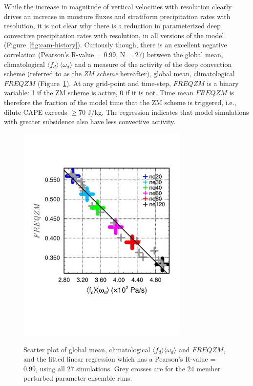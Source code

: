 \documentclass[alpha-refs]{wiley-article}
\begin{document}
While the increase in magnitude of vertical velocities with resolution clearly drives an increase in moisture fluxes and stratiform precipitation rates with resolution, it is not clear why there is a reduction in parameterized deep convective precipitation rates with resolution, in all versions of the model (Figure~\ref{fig:cam-history}). Curiously though, there is an excellent negative correlation (Pearson's R-value = 0.99, N = 27) between the global mean, climatological $\langle f_{d} \rangle \, \langle \omega_{d} \rangle$ and a measure of the activity of the \cite{ZM1995AO} deep convection scheme (referred to as the {\em{ZM scheme}} hereafter), global mean, climatological $FREQZM$ (Figure~\ref{fig:corr}). At any grid-point and time-step, $FREQZM$ is a binary variable: 1 if the ZM scheme is active, 0 if it is not. Time mean $FREQZM$ is therefore the fraction of the model time that the ZM scheme is triggered, i.e., dilute CAPE exceeds $\geq 70$ J/kg. The regression indicates that model simulations with greater subsidence also have less convective activity.

\begin{figure}
\begin{center}
\noindent\includegraphics[width=20pc,angle=0]{figs/temp_diags_corr.pdf}\\
\end{center}
\caption{Scatter plot of global mean, climatological $\langle f_{d} \rangle \langle \omega_{d} \rangle$ and $FREQZM$, and the fitted linear regression which has a Pearson's R-value = 0.99, using all 27 simulations. Grey crosses are for the 24 member perturbed parameter ensemble runs.}
\label{fig:corr}
\end{figure}
\end{document}
